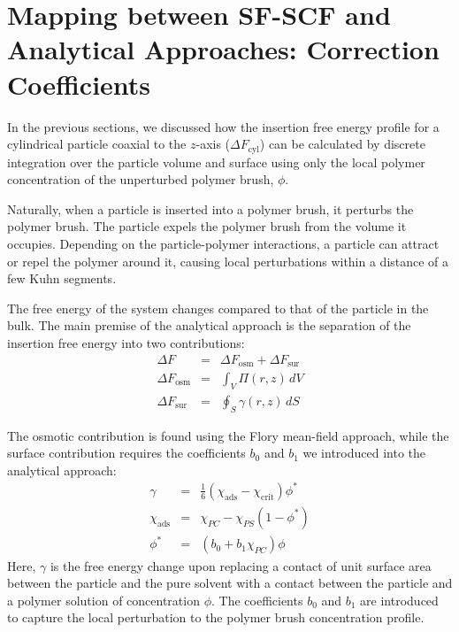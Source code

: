 \documentclass[10pt, a4paper]{article}
\begin{document}
\section{Mapping between SF-SCF and Analytical Approaches: Correction Coefficients}
\begin{multicols}{2}

In the previous sections, we discussed how the insertion free energy profile for a cylindrical particle coaxial to the $z$-axis ($\Delta F_{\textrm{cyl}}$) can be calculated by discrete integration over the particle volume and surface using only the local polymer concentration of the unperturbed polymer brush, $\phi$.

Naturally, when a particle is inserted into a polymer brush, it perturbs the polymer brush.
The particle expels the polymer brush from the volume it occupies.
Depending on the particle-polymer interactions, a particle can attract or repel the polymer around it, causing local perturbations within a distance of a few Kuhn segments.

The free energy of the system changes compared to that of the particle in the bulk.
The main premise of the analytical approach is the separation of the insertion free energy into two contributions:
\begin{eqnarray}
    \label{eq:Delta_F} \Delta F &=& \Delta F_{\textrm{osm}} + \Delta F_{\textrm{sur}} \\
    \label{eq:Delta_F_V} \Delta F_{\textrm{osm}} &=& \int_{V} \Pi(r, z) \, dV \\
    \label{eq:Delta_F_S} \Delta F_{\textrm{sur}} &=& \oint_{S} \gamma(r, z) \, dS
\end{eqnarray}

The osmotic contribution is found using the Flory mean-field approach, while the surface contribution requires the coefficients $b_0$ and $b_1$ we introduced into the analytical approach:
\begin{eqnarray}
    \gamma &=& \frac{1}{6} (\chi_{\textrm{ads}} - \chi_{\textrm{crit}}) \phi^{\ast} \\
    \chi_{\textrm{ads}} &=& \chi_{PC} - \chi_{PS} (1 - \phi^{\ast}) \\
    \phi^{\ast} &=& (b_0 + b_1 \chi_{PC}) \phi \label{eq:phi_correction}
\end{eqnarray}
Here, $\gamma$ is the free energy change upon replacing a contact of unit surface area between the particle and the pure solvent with a contact between the particle and a polymer solution of concentration $\phi$.
The coefficients $b_0$ and $b_1$ are introduced to capture the local perturbation to the polymer brush concentration profile.


\end{multicols}
\end{document}
